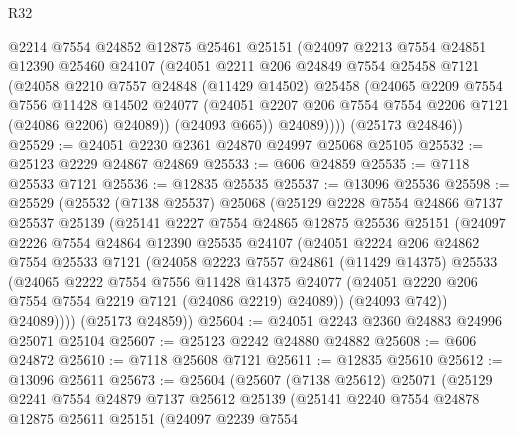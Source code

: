 \begin{lexlean}{R32}
\begin{coremodule}
          @2214
          @7554
          @24852
          @12875
          @25461
          @25151
          (@24097
            @2213
            @7554
            @24851
            @12390
            @25460
            @24107
            (@24051
              @2211
              @206
              @24849
              @7554
              @25458
              @7121
              (@24058
                @2210
                @7557
                @24848
                (@11429 @14502)
                @25458
                (@24065
                  @2209
                  @7554
                  @7556
                  @11428
                  @14502
                  @24077
                  (@24051 @2207 @206 @7554 @7554 @2206 @7121 (@24086 @2206) @24089))
                (@24093 @665))
              @24089))))
      (@25173 @24846))
@25529 := @24051 @2230 @2361 @24870 @24997 @25068 @25105
@25532 := @25123 @2229 @24867 @24869
@25533 := @606 @24859
@25535 := @7118 @25533 @7121
@25536 := @12835 @25535
@25537 := @13096 @25536
@25598 := @25529
    (@25532
      (@7138 @25537)
      @25068
      (@25129
        @2228
        @7554
        @24866
        @7137
        @25537
        @25139
        (@25141
          @2227
          @7554
          @24865
          @12875
          @25536
          @25151
          (@24097
            @2226
            @7554
            @24864
            @12390
            @25535
            @24107
            (@24051
              @2224
              @206
              @24862
              @7554
              @25533
              @7121
              (@24058
                @2223
                @7557
                @24861
                (@11429 @14375)
                @25533
                (@24065
                  @2222
                  @7554
                  @7556
                  @11428
                  @14375
                  @24077
                  (@24051 @2220 @206 @7554 @7554 @2219 @7121 (@24086 @2219) @24089))
                (@24093 @742))
              @24089))))
      (@25173 @24859))
@25604 := @24051 @2243 @2360 @24883 @24996 @25071 @25104
@25607 := @25123 @2242 @24880 @24882
@25608 := @606 @24872
@25610 := @7118 @25608 @7121
@25611 := @12835 @25610
@25612 := @13096 @25611
@25673 := @25604
    (@25607
      (@7138 @25612)
      @25071
      (@25129
        @2241
        @7554
        @24879
        @7137
        @25612
        @25139
        (@25141
          @2240
          @7554
          @24878
          @12875
          @25611
          @25151
          (@24097
            @2239
            @7554

\end{coremodule}
\end{lexlean}
